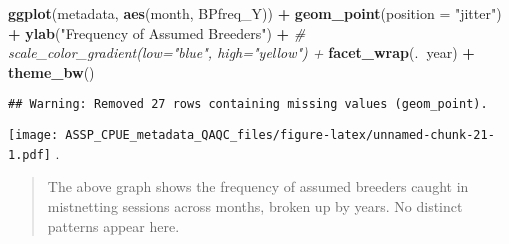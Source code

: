 \documentclass[
]{article}
\newenvironment{Shaded}{\begin{snugshade}}{\end{snugshade}}
\newcommand{\CommentTok}[1]{\textcolor[rgb]{0.56,0.35,0.01}{\textit{#1}}}
\newcommand{\DataTypeTok}[1]{\textcolor[rgb]{0.13,0.29,0.53}{#1}}
\newcommand{\KeywordTok}[1]{\textcolor[rgb]{0.13,0.29,0.53}{\textbf{#1}}}
\newcommand{\NormalTok}[1]{#1}
\newcommand{\OperatorTok}[1]{\textcolor[rgb]{0.81,0.36,0.00}{\textbf{#1}}}
\newcommand{\StringTok}[1]{\textcolor[rgb]{0.31,0.60,0.02}{#1}}
\begin{document}
\begin{Shaded}
\begin{Highlighting}[]
\KeywordTok{ggplot}\NormalTok{(metadata, }\KeywordTok{aes}\NormalTok{(month, BPfreq_Y)) }\OperatorTok{+}
\StringTok{  }\KeywordTok{geom_point}\NormalTok{(}\DataTypeTok{position =} \StringTok{"jitter"}\NormalTok{) }\OperatorTok{+}
\StringTok{  }\KeywordTok{ylab}\NormalTok{(}\StringTok{"Frequency of Assumed Breeders"}\NormalTok{) }\OperatorTok{+}
\StringTok{  }\CommentTok{# scale_color_gradient(low="blue", high="yellow") +}
\StringTok{  }\KeywordTok{facet_wrap}\NormalTok{(.}\OperatorTok{~}\NormalTok{year) }\OperatorTok{+}
\StringTok{  }\KeywordTok{theme_bw}\NormalTok{()}
\end{Highlighting}
\end{Shaded}

\begin{verbatim}
## Warning: Removed 27 rows containing missing values (geom_point).
\end{verbatim}

\texttt{[image: ASSP\_CPUE\_metadata\_QAQC\_files/figure-latex/unnamed-chunk-21-1.pdf]}
.

\begin{quote}
The above graph shows the frequency of assumed breeders caught in
mistnetting sessions across months, broken up by years. No distinct
patterns appear here.
\end{quote}
\end{document}
